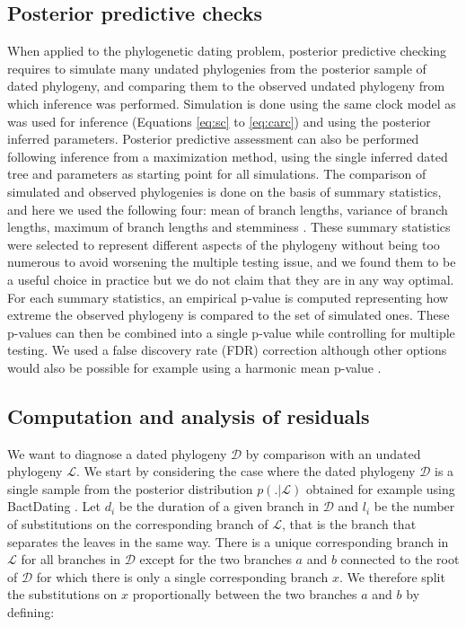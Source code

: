 \documentclass{article}
\begin{document}
\subsection*{Posterior predictive checks}

When applied to the phylogenetic dating problem, posterior predictive checking requires
to simulate many undated phylogenies from the posterior sample of dated phylogeny,
and comparing them to the observed undated phylogeny from which inference was performed.
Simulation is done using the same clock model as was used for inference (Equations \ref{eq:sc} to \ref{eq:carc})
and using the posterior inferred parameters. Posterior predictive assessment can also be performed
following inference from a maximization method, using the single inferred dated tree and parameters as 
starting point for all simulations. 
The comparison of simulated and observed phylogenies is done on the basis of summary statistics, and
here we used the following four: mean of branch lengths, variance of branch lengths,
maximum of branch lengths and stemminess \citep{fialaFactorsDeterminingAccuracy1985}. 
These summary statistics were selected to represent different aspects of the phylogeny without
being too numerous to avoid worsening the multiple testing issue, and we found them to be a useful
choice in practice but we do not claim that they are in any way optimal.
For each summary statistics, an empirical p-value is computed representing how extreme the 
observed phylogeny is compared to the set of simulated ones. 
These p-values can then be combined into a single p-value while controlling for multiple testing.
We used a false discovery rate (FDR) correction \citep{Benjamini1995} although other options would also be 
possible for example using a harmonic mean p-value \citep{wilsonHarmonicMeanPvalue2019}.

\subsection*{Computation and analysis of residuals}

We want to diagnose a dated phylogeny $\mathcal{D}$ by comparison with an undated phylogeny $\mathcal{L}$. We start by considering the case where the dated phylogeny $\mathcal{D}$ is a single sample from the posterior distribution $p(.|\mathcal{L})$ obtained for example using BactDating \citep{Didelot2018}.
Let $d_i$ be the duration of a given branch in $\mathcal{D}$ and $l_i$ be the number of substitutions on the corresponding branch of $\mathcal{L}$, that is the branch that separates the leaves in the same way. There is a unique corresponding branch in $\mathcal{L}$ for all branches in $\mathcal{D}$ except for the two branches $a$ and $b$ connected to the root of $\mathcal{D}$ for which there is only a single corresponding branch $x$. We therefore split the substitutions on $x$ proportionally between the two branches $a$ and $b$ by defining:
\end{document}

